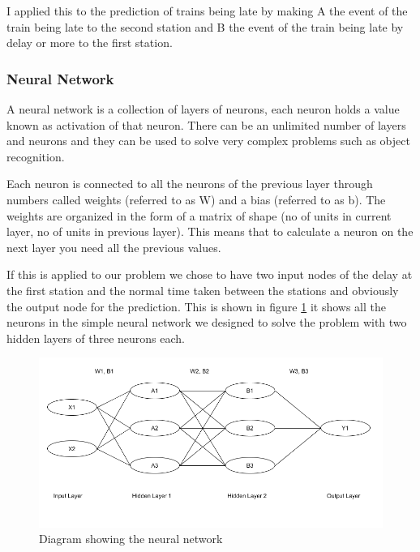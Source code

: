 \documentclass[11pt]{article}
\begin{document}
	I applied this to the prediction of trains being late by making A the event of the train being late to the second station and B the event of the train being late by delay or more to the first station.
	
	\subsubsection{Neural Network}
	
	A neural network is a collection of layers of neurons, each neuron holds a value known as activation of that neuron. There can be an unlimited number of layers and neurons and they can be used to solve very complex problems such as object recognition.
	
	Each neuron is connected to all the neurons of the previous layer through numbers called weights (referred to as W) and a bias (referred to as b). The weights are organized in the form of a matrix of shape (no of units in current layer, no of units in previous layer). This means that to calculate a neuron on the next layer you need all the previous values.
	
	If this is applied to our problem we chose to have two input nodes of the delay at the first station and the normal time taken between the stations and obviously the output node for the prediction. This is shown in figure \ref{Img:NNDiagram} it shows all the neurons in the simple neural network we designed to solve the problem with two hidden layers of three neurons each.
	
	\begin{figure}[!htb]
		\begin{center}
			\includegraphics[width=1\textwidth]{Resources/PartTwo/NNDiagram.png}
			\caption{Diagram showing the neural network}
			\label{Img:NNDiagram}
		\end{center}
	\end{figure}
	
\end{document}
